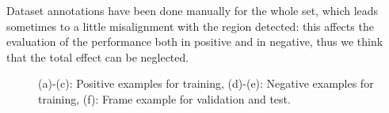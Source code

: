 \documentclass[a4paper,letterpaper, 11pt, onecolumn]{article} %
\begin{document}
Dataset annotations have been done manually for the whole set, which leads sometimes to a little misalignment with the region detected: this affects the evaluation of the performance both in positive and in negative, thus we think that the total effect can be neglected.
\\
\begin{figure}[h!]
\centering
{}

\caption{(a)-(c): Positive examples for training, (d)-(e): Negative examples for training, (f): Frame example for validation and test.}
\label{fig:dataset}
\end{figure}
\\
\end{document}
